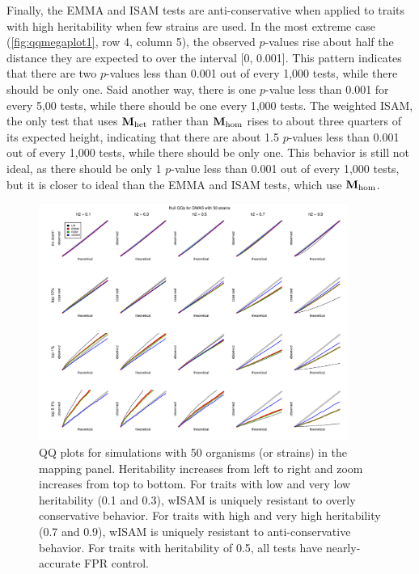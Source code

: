 Finally, the EMMA and ISAM tests are anti-conservative when applied to traits with high heritability when few strains are used.
In the most extreme case (\autoref{fig:qqmegaplot1}, row 4, column 5), the observed $p$-values rise about half the distance they are expected to over the interval [0, 0.001].
This pattern indicates that there are two $p$-values less than 0.001 out of every 1,000 tests, while there should be only one.
Said another way, there is one $p$-value less than 0.001 for every 5,00 tests, while there should be one every 1,000 tests.
The weighted ISAM, the only test that uses $\mathbf{M}_\text{het}$ rather than $\mathbf{M}_\text{hom}$ rises to about three quarters of its expected height, indicating that there are about 1.5 $p$-values less than 0.001 out of every 1,000 tests, while there should be only one.
This behavior is still not ideal, as there should be only 1 $p$-value less than 0.001 out of every 1,000 tests, but it is closer to ideal than the EMMA and ISAM tests, which use $\mathbf{M}_\text{hom}$.

\begin{figure}
  \centering
  \includegraphics[width = 0.9\textwidth]{images/2018-05-19alt_heterosked_sims_nstrain=50_nsnps=100_nsims=10000.pdf}
  \caption[
    QQ plots for simulations with 50 organisms in the mapping panel.
  ]{
    QQ plots for simulations with 50 organisms (or strains) in the mapping panel.
    Heritability increases from left to right and zoom increases from top to bottom.
    For traits with low and very low heritability (0.1 and 0.3), wISAM is uniquely resistant to overly conservative behavior.
    For traits with high and very high heritability (0.7 and 0.9), wISAM is uniquely resistant to anti-conservative behavior.
    For traits with heritability of 0.5, all tests have nearly-accurate FPR control.
  }
  \label{fig:qqmegaplot1}
\end{figure}

